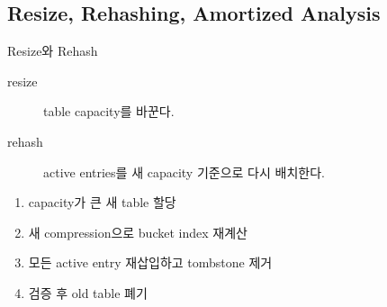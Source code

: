 \subsection{Resize, Rehashing, Amortized Analysis}
\begin{frame}{Resize와 Rehash}
\begin{description}
\item[resize] table capacity를 바꾼다.
\item[rehash] active entries를 새 capacity 기준으로 다시 배치한다.
\end{description}
\begin{enumerate}
\item capacity가 큰 새 table 할당
\item 새 compression으로 bucket index 재계산
\item 모든 active entry 재삽입하고 tombstone 제거
\item 검증 후 old table 폐기
\end{enumerate}
\end{frame}
